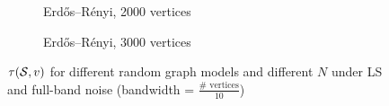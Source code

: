 \begin{figure}
\begin{subfigure}{0.3\columnwidth}
    \end{subfigure}
    \hfill
    \begin{subfigure}{0.3\columnwidth}
    \caption{Erdős–Rényi, 2000 vertices}%
    \label{snr_ER_2000}%
    \end{subfigure}
    \hfill%
    \begin{subfigure}{0.3\columnwidth}
    \caption{Erdős–Rényi, 3000 vertices}%
    \label{snr_ER_3000}%
    \end{subfigure}%
    \caption{$\tau(\mathcal{S},v)$ for different random graph models and different $N$ under LS and full-band noise (bandwidth = $\frac{\# \text{ vertices}}{10}$)}
\label{LS_SNR_Threshold_plots_all}
\end{figure}


